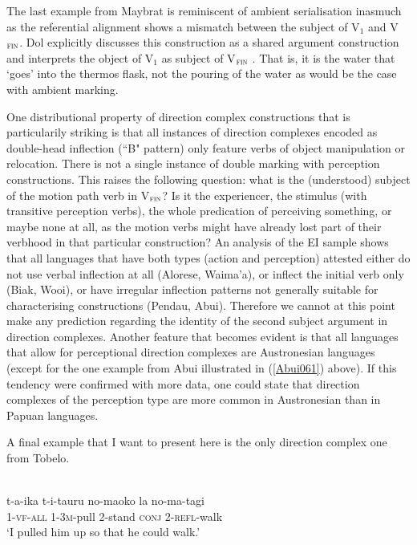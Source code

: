 The last example from Maybrat is reminiscent of ambient serialisation inasmuch as the referential alignment shows a mismatch between the subject of V$_{1}$ and V$_{\textsc{fin}}$. Dol explicitly discusses this construction as a shared argument construction and interprets the object of V$_{1}$ as subject of V$_{\textsc{fin}}$ \citep[217]{dol2007grammar}. That is, it is the water that `goes' into the thermos flask, not the pouring of the water as would be the case with ambient marking. 

One distributional property of direction complex constructions that is particularily striking is that all instances of direction complexes encoded as double-head inflection (``B" pattern) only feature verbs of object manipulation or relocation. There is not a single instance of double marking with perception constructions. This raises the following question: what is the (understood) subject of the motion path verb in V$_{\textsc{fin}}$? Is it the experiencer, the stimulus (with transitive perception verbs), the whole predication of perceiving something, or maybe none at all, as the motion verbs might have already lost part of their verbhood in that particular construction? An analysis of the EI sample shows that all languages that have both types (action and perception) attested either do not use verbal inflection at all (Alorese, Waima'a), or inflect the initial verb only (Biak, Wooi), or have irregular inflection patterns not generally suitable for characterising constructions (Pendau, Abui). Therefore we cannot at this point make any prediction regarding the identity of the second subject argument in direction complexes. Another feature that becomes evident is that all languages that allow for perceptional direction complexes are Austronesian languages (except for the one example from Abui illustrated in (\ref{Abui061}) above). If this tendency were confirmed with more data, one could state that direction complexes of the perception type are more common in Austronesian than in Papuan languages.

A final example that I want to present here is the only direction complex one from Tobelo. 

\ea \label{Tobelo033}
\\
\gll t-a-ika t-i-tauru no-maoko la no-ma-tagi \\
\textsc{1}-\textsc{vf}-\textsc{all} \textsc{1}-\textsc{3}\textsc{m}-pull \textsc{2}-stand \textsc{conj} \textsc{2}-\textsc{refl}-walk \\
\glft `I pulled him up so that he could walk.' \\ 
\z

